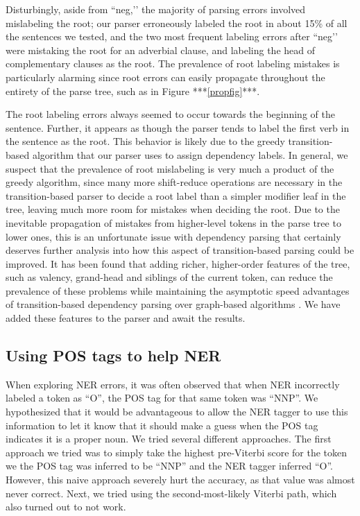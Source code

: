 \documentclass[12pt]{article}
\begin{document}
Disturbingly, aside from ``neg,’’ the majority of parsing errors involved mislabeling the root; our parser erroneously labeled the root in about 15\% of all the sentences we tested, and the two most frequent labeling errors after ``neg’’ were mistaking the root for an adverbial clause, and labeling the head of complementary clauses as the root. The prevalence of root labeling mistakes is particularly alarming since root errors can easily propagate throughout the entirety of the parse tree, such as in Figure ***\ref{propfig}***. 

The root labeling errors always seemed to occur towards the beginning of the sentence. Further, it appears as though the parser tends to label the first verb in the sentence as the root. This behavior is likely due to the greedy transition-based algorithm that our parser uses to assign dependency labels. In general, we suspect that the prevalence of root mislabeling is very much a product of the greedy algorithm, since many more shift-reduce operations are necessary in the transition-based parser to decide a root label than a simpler modifier leaf in the tree, leaving much more room for mistakes when deciding the root. Due to the inevitable propagation of mistakes from higher-level tokens in the parse tree to lower ones, this is an unfortunate issue with dependency parsing that certainly deserves further analysis into how this aspect of transition-based parsing could be improved. It has been found that adding richer, higher-order features of the tree, such as valency, grand-head and siblings of the current token, can reduce the prevalence of these problems while maintaining the asymptotic speed advantages of transition-based dependency parsing over graph-based algorithms \cite{zhang-nivre-12}. We have added these features to the parser and await the results.

\subsection{Using POS tags to help NER}
When exploring NER errors, it was often observed that when NER incorrectly labeled a token as “O”, the POS tag for that same token was “NNP”. We hypothesized that it would be advantageous to allow the NER tagger to use this information to let it know that it should make a guess when the POS tag indicates it is a proper noun. We tried several different approaches. The first approach we tried was to simply take the highest pre-Viterbi score for the token we the POS tag was inferred to be “NNP” and the NER tagger inferred “O”. However, this naive approach severely hurt the accuracy, as that value was almost never correct. Next, we tried using the second-most-likely Viterbi path, which also turned out to not work.
\end{document}
